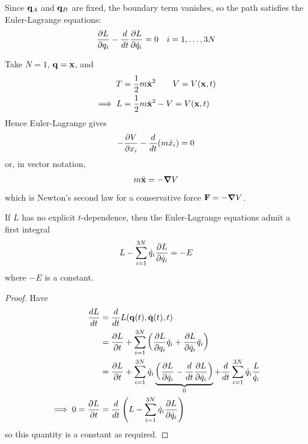 \documentclass{../../template/note}
\begin{document}
    Since $\V q_A$ and $\V q_B$ are fixed, the boundary term vanishes, so the path satisfies the Euler-Lagrange equations:
    \begin{align*}
        \pd{L}{q_i} - \frac{d}{dt} \pd{L}{\dot q_i} = 0 && i = 1, \dots, 3N
    \end{align*}
    
    \begin{example*}
        Take $N=1$, $\V q = \V x$, and
        \begin{align*}
            T &= \frac 1 2 m \dot{\V x}^2 \qquad V = V(\V x, t) \\
            \implies L &= \frac 1 2 m \dot{\V x}^2 - V = V(\V x, t)
        \end{align*}
        Hence Euler-Lagrange gives
        \begin{align*}
            -\pd{V}{x_i} - \frac{d}{dt}(m \dot x_i) = 0
        \end{align*}
        or, in vector notation,
        \begin{align*}
            m \ddot{\V x} = -\grad V
        \end{align*}
        which is Newton's second law for a conservative force $\V F = -\grad V$.  
    \end{example*}
    
    \begin{proposition}
        If $L$ has no explicit $t$-dependence, then the Euler-Lagrange equations admit a first integral
        \begin{align*}
            L - \sum_{i=1}^{3N} \dot q_i \pd{L}{\dot q_i} = -E
        \end{align*}
        where $-E$ is a constant.        
    \end{proposition}
    
    \begin{proof}
        Have
        \begin{align*}
            \frac{dL}{dt} &= \frac{d}{dt} L(\V q(t), \dot{\V q}(t), t) \\
            &= \pd{L}{t} + \sum_{i=1}^{3N} \left(\pd{L}{q_i}\dot q_i + \pd{L}{\dot q_i} \ddot q_i \right) \\
            &= \pd{L}{t} + \sum_{i=1}^{3N} \dot q_i \underbrace{\left(\pd{L}{\dot q_i} - \frac{d}{dt} \pd{L}{\dot q_i}\right)}_0 + \frac{d}{dt} \sum_{i=1}^{3N} \dot q_i \frac{L}{\dot q_i} \\
            \implies 0 = \pd{L}{t} &= \frac{d}{dt} \left(L - \sum_{i=1}^{3N} \dot q_i \pd{L}{\dot q_i}\right)
        \end{align*}
        so this quantity is a constant as required.        
    \end{proof}
    
\end{document}
